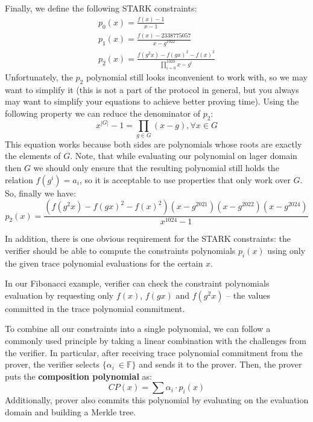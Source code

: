\documentclass[../lecture-notes.tex]{subfiles}
\begin{document}
\begin{example}
Finally, we define the following STARK constraints:
\begin{gather*}
    p_0(x) = \frac{f(x)-1}{x - 1} \\
    p_1(x) = \frac{f(x) - 2338775057}{x - g^{1022}} \\
    p_2(x) = \frac{f(g^2x) - f(gx)^2 - f(x)^2}{\prod_{i=0}^{1020} x - g^i}
\end{gather*}
Unfortunately, the $p_2$ polynomial still looks inconvenient to work with, so we may want to simplify it (this is not a part of the protocol in general, but you always may want to simplify your equations to achieve better proving time). Using the following property we can reduce the denominator of $p_2$:
\begin{equation*}
x^{|G|} - 1 = \prod_{g \in G}(x-g), \forall x \in G  
\end{equation*}
This equation works because both sides are polynomials whose roots are exactly the elements of $G$. Note, that while evaluating our polynomial on lager domain then $G$ we should only ensure that the resulting polynomial still holds the relation $f(g^i) = a_i$, so it is acceptable to use properties that only work over $G$. So, finally we have:
\begin{equation*}
p_2(x) = \frac{(f(g^2x) - f(gx)^2 - f(x)^2)(x - g^{2021})(x - g^{2022})(x - g^{2024})}{x^{1024} - 1}  
\end{equation*}
\end{example}

In addition, there is one obvious requirement for the STARK constraints: the verifier should be able to compute the constraints polynomials $p_i(x)$ using only the given trace polynomial evaluations for the certain $x$.

\begin{remark}
In our Fibonacci example, verifier can check the constraint polynomials evaluation by requesting only $f(x)$, $f(gx)$ and $f(g^2x)$ -- the values committed in the trace polynomial commitment.
\end{remark}

To combine all our constraints into a single polynomial, we can follow a commonly used principle by taking a linear combination with the challenges from the verifier. In particular, after receiving trace polynomial commitment from the prover, the verifier selects $\{\alpha_i\ \in \mathbb{F}\}$ and sends it to the prover. Then, the prover puts the \textbf{composition polynomial} as:
\begin{equation*}
CP(x) = \sum \alpha_i\cdot p_i(x)
\end{equation*}
Additionally, prover also commits this polynomial by evaluating on the evaluation domain and building a Merkle tree.
\end{document}
